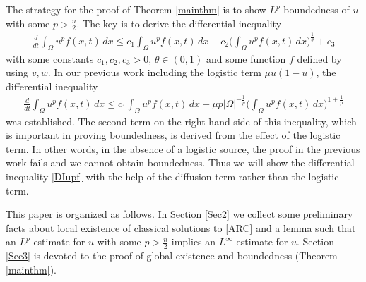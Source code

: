 \documentclass[12pt,reqno,draft]{article}
\numberwithin{equation}{section}
\theoremstyle{theorem}
\theoremstyle{definition}
\begin{document}
The strategy for the proof of Theorem \ref{mainthm} is
to show $L^p$-boundedness of $u$ 
with some $p>\frac{n}{2}$. 
The key is to derive the differential inequality
%
    \begin{align} \label{DIupf}
         \frac{d}{dt} \int_\Omega u^pf(x, t)\,dx
    \le c_1\int_\Omega u^p f(x, t)\,dx-c_2
         \Big(\int_\Omega u^p f(x, t)\,dx\Big)^{\frac{1}{\theta}}+c_3
    \end{align}
% 
with some constants $c_1, c_2, c_3>0$, $\theta\in(0,1)$ and some
function $f$ defined by using $v, w$. 
In our previous work including the logistic term $\mu u(1-u)$,  the differential inequality 
    \begin{align*}
         \frac{d}{dt} \int_\Omega u^pf(x, t)\,dx
    \le c_1\int_\Omega u^p f(x, t)\,dx-\mu p |\Omega|^{-\frac{1}{p}}
         \Big(\int_\Omega u^p f(x, t)\,dx\Big)^{1+\frac{1}{p}}
    \end{align*}
was established. 
The second term on the right-hand side of this inequality, 
which is important in proving boundedness, 
is derived from the effect of the logistic term. 
In other words, in the absence of a logistic source, 
the proof in the previous work fails and we cannot obtain boundedness.
Thus we will show the differential inequality \eqref{DIupf} with 
the help of the diffusion term rather than the logistic term.
\vspace{2.5mm}

This paper is organized as follows. 
In Section \ref{Sec2} we collect some preliminary facts about 
local existence of classical solutions to \eqref{ARC} and 
a lemma such that an $L^p$-estimate for $u$ 
with some $p>\frac{n}{2}$ implies an $L^\infty$-estimate for $u$. 
Section \ref{Sec3} is devoted to the proof of global existence 
and boundedness (Theorem \ref{mainthm}).
\vspace{5mm}


\end{document}
